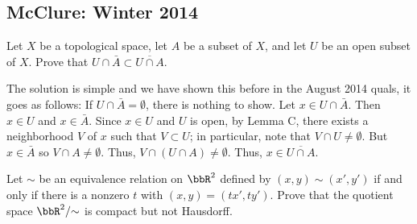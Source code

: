 \subsection{McClure:  Winter 2014}
\setcounter{exercise}{0}
\begin{problem}
  Let \(X\) be a topological space, let \(A\) be a subset of \(X\), and let
  \(U\) be an open subset of \(X\). Prove that
  \(U\cap\bar A\subset\overline{U\cap A}\).
\end{problem}
\begin{solution}
  The solution is simple and we have shown this before in the August 2014
  quals, it goes as follows: If \(U\cap\bar A=\emptyset\), there is nothing
  to show. Let \(x\in U\cap\bar A\). Then \(x\in U\) and \(x\in\bar
  A\). Since \(x\in U\) and \(U\) is open, by Lemma C, there exists a
  neighborhood \(V\) of \(x\) such that \(V\subset U\); in particular,
  note that \(V\cap U\neq\emptyset\). But \(x\in\bar A\) so
  \(V\cap A\neq\emptyset\). Thus, \(V\cap(U\cap A)\neq\emptyset\). Thus,
  \(x\in\overline{U\cap A}\).
\end{solution}
\begin{problem}
  Let \(\sim\) be an equivalence relation on \(\bbR^2\) defined by
  \((x,y)\sim(x',y')\) if and only if there is a nonzero \(t\) with
  \((x,y)=(tx',ty')\). Prove that the quotient space \(\bbR^2/{\sim}\) is
  compact but not Hausdorff.
\end{problem}
